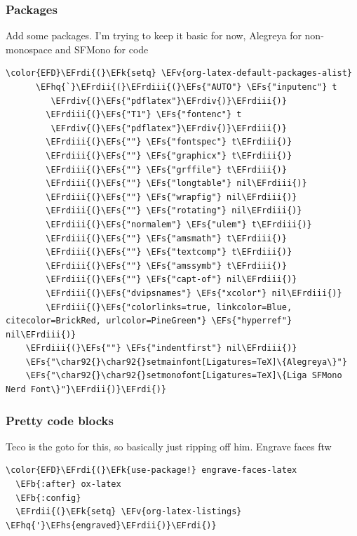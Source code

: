 \documentclass{scrartcl}
\newcommand{\EFk}[1]{\textcolor{EFk}{#1}} %
\newcommand{\EFs}[1]{\textcolor{EFs}{#1}} %
\newcommand{\EFb}[1]{\textcolor{EFb}{#1}} %
\newcommand{\EFv}[1]{\textcolor{EFv}{#1}} %
\newcommand{\EFhq}[1]{\textcolor{EFhq}{#1}} %
\newcommand{\EFhs}[1]{\textcolor{EFhs}{#1}} %
\newcommand{\EFrdi}[1]{\textcolor{EFrdi}{#1}} %
\newcommand{\EFrdii}[1]{\textcolor{EFrdii}{#1}} %
\newcommand{\EFrdiii}[1]{\textcolor{EFrdiii}{#1}} %
\newcommand{\EFrdiv}[1]{\textcolor{EFrdiv}{#1}} %
\begin{document}
\subsubsection{Packages}
\label{sec:org5d367b1}
Add some packages. I'm trying to keep it basic for now, Alegreya for
non-monospace and SFMono for code
\begin{Code}
\begin{Verbatim}[]
\color{EFD}\EFrdi{(}\EFk{setq} \EFv{org-latex-default-packages-alist}
      \EFhq{`}\EFrdii{(}\EFrdiii{(}\EFs{"AUTO"} \EFs{"inputenc"} t
         \EFrdiv{(}\EFs{"pdflatex"}\EFrdiv{)}\EFrdiii{)}
        \EFrdiii{(}\EFs{"T1"} \EFs{"fontenc"} t
         \EFrdiv{(}\EFs{"pdflatex"}\EFrdiv{)}\EFrdiii{)}
        \EFrdiii{(}\EFs{""} \EFs{"fontspec"} t\EFrdiii{)}
        \EFrdiii{(}\EFs{""} \EFs{"graphicx"} t\EFrdiii{)}
        \EFrdiii{(}\EFs{""} \EFs{"grffile"} t\EFrdiii{)}
        \EFrdiii{(}\EFs{""} \EFs{"longtable"} nil\EFrdiii{)}
        \EFrdiii{(}\EFs{""} \EFs{"wrapfig"} nil\EFrdiii{)}
        \EFrdiii{(}\EFs{""} \EFs{"rotating"} nil\EFrdiii{)}
        \EFrdiii{(}\EFs{"normalem"} \EFs{"ulem"} t\EFrdiii{)}
        \EFrdiii{(}\EFs{""} \EFs{"amsmath"} t\EFrdiii{)}
        \EFrdiii{(}\EFs{""} \EFs{"textcomp"} t\EFrdiii{)}
        \EFrdiii{(}\EFs{""} \EFs{"amssymb"} t\EFrdiii{)}
        \EFrdiii{(}\EFs{""} \EFs{"capt-of"} nil\EFrdiii{)}
        \EFrdiii{(}\EFs{"dvipsnames"} \EFs{"xcolor"} nil\EFrdiii{)}
        \EFrdiii{(}\EFs{"colorlinks=true, linkcolor=Blue, citecolor=BrickRed, urlcolor=PineGreen"} \EFs{"hyperref"} nil\EFrdiii{)}
    \EFrdiii{(}\EFs{""} \EFs{"indentfirst"} nil\EFrdiii{)}
    \EFs{"\char92{}\char92{}setmainfont[Ligatures=TeX]\{Alegreya\}"}
    \EFs{"\char92{}\char92{}setmonofont[Ligatures=TeX]\{Liga SFMono Nerd Font\}"}\EFrdii{)}\EFrdi{)}
\end{Verbatim}
\end{Code}

\subsubsection{Pretty code blocks}
\label{sec:org75590ec}
Teco is the goto for this, so basically just ripping off him. Engrave faces ftw
\begin{Code}
\begin{Verbatim}[]
\color{EFD}\EFrdi{(}\EFk{use-package!} engrave-faces-latex
  \EFb{:after} ox-latex
  \EFb{:config}
  \EFrdii{(}\EFk{setq} \EFv{org-latex-listings} \EFhq{'}\EFhs{engraved}\EFrdii{)}\EFrdi{)}
\end{Verbatim}
\end{Code}
\end{document}
